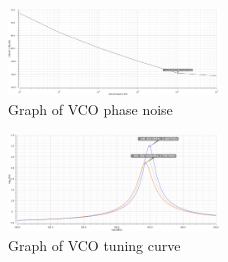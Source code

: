 \begin{figure}[H]
   \centering
    \includegraphics[width=0.5\textwidth]{figures/VCOPhaseNoise.png}
    \caption{Graph of VCO phase noise}
    \label{fig:vcophase}
\end{figure}

\begin{figure}[H]
   \centering
    \includegraphics[width=0.5\textwidth]{figures/VCOTuning.png}
    \caption{Graph of VCO tuning curve}
    \label{fig:vcotune}
\end{figure}